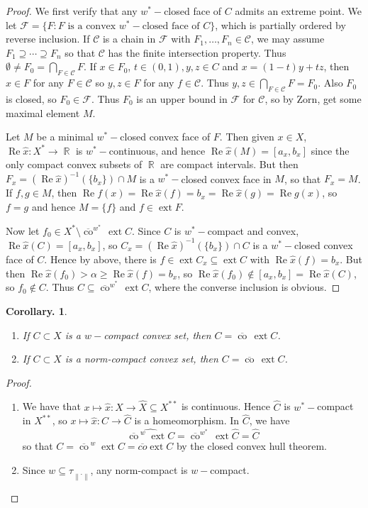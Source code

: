 \documentclass[11pt, a4paper]{memoir}
\DeclareMathOperator{\R}{{\mathbb{R}}}
\newcommand{\norm}[1]{\ensuremath{\left\lVert#1\right\rVert}}
\theoremstyle{change}
\newtheorem{corollary}[theorem]{Corollary.}
\theoremstyle{plain}
\theoremstyle{nonumberplain}
\newtheorem{proof}{Proof}
\renewcommand{\Re}{\ensuremath{\operatorname{Re}}}
\DeclareMathOperator{\ext}{ext}
\newcommand{\cwx}{\ensuremath{\overline{\operatorname{co}}^{w^*}\,}}
\newcommand{\cw}{\ensuremath{\overline{\operatorname{co}}\,}}
\numberwithin{equation}{section}
\begin{document}
\begin{proof}
    We first verify that any $w^*-$closed face of $C$ admits an extreme point.
    We let $\mathcal{F}=\{F:F\text{ is a convex $w^*-$closed face of $C$}\}$, which is partially ordered by reverse inclusion.
    If $\mathcal{C}$ is a chain in $\mathcal{F}$ with $F_1,\ldots,F_n\in\mathcal{C}$, we may assume $F_1\supseteq\cdots\supseteq F_n$ so that $\mathcal{C}$ has the finite intersection property.
    Thus $\emptyset\neq F_0=\bigcap_{F\in\mathcal{C}}F$.
    If $x\in F_0$, $t\in(0,1),y,z\in C$ and $x=(1-t)y+tz$, then $x\in F$ for any $F\in\mathcal{C}$ so $y,z\in F$ for any $f\in\mathcal{C}$.
    Thus $y,z\in\bigcap_{F\in\mathcal{C}}F=F_0$.
    Also $F_0$ is closed, so $F_0\in\mathcal{F}$.
    Thus $F_0$ is an upper bound in $\mathcal{F}$ for $\mathcal{C}$, so by Zorn, get some maximal element $M$.

    Let $M$ be a minimal $w^*-$closed convex face of $F$.
    Then given $x\in X$, $\Re\hat x:X^*\to\R$ is $w^*-$continuous, and hence $\Re\hat x(M)=[a_x,b_x]$ since the only compact convex subsets of $\R$ are compact intervals.
    But then $F_x=(\Re \hat x)^{-1}(\{b_x\})\cap M$ is a $w^*-$closed convex face in $M$, so that $F_x=M$.
    If $f,g\in M$, then $\Re f(x)=\Re\hat x(f)=b_x=\Re\hat x(g)=\Re g(x)$, so $f=g$ and hence $M=\{f\}$ and $f\in\ext F$.

    Now let $f_0\in X^*\setminus\cwx\ext C$.
    Since $C$ is $w^*-$compact and convex, $\Re\hat x(C)=[a_x,b_x]$, so $C_x=(\Re\hat x)^{-1}(\{b_x\})\cap C$ is a $w^*-$closed convex face of $C$.
    Hence by above, there is $f\in\ext C_x\subseteq\ext C$ with $\Re\hat x(f)=b_x$.
    But then $\Re\hat x(f_0)>\alpha\geq\Re\hat x(f)=b_x$, so $\Re\hat x(f_0)\notin[a_x,b_x]=\Re\hat x(C)$, so $f_0\notin C$.
    Thus $C\subseteq\cwx\ext C$, where the converse inclusion is obvious.
\end{proof}
\begin{corollary}
    \begin{enumerate}[nl,r]
        \item If $C\subset X$ is a $w-$compact convex set, then $C=\cw\ext C$.
        \item If $C\subset X$ is a norm-compact convex set, then $C=\cw\ext C$.
    \end{enumerate}
\end{corollary}
\begin{proof}
    \begin{enumerate}[nl,r]
        \item We have that $x\mapsto\hat x:X\to\hat X\subseteq X^{**}$ is continuous.
            Hence $\hat C$ is $w^*-$compact in $X^{**}$, so $x\mapsto\hat x:C\to\hat C$ is a homeomorphism.
            In $\hat C$, we have
            \begin{equation*}
                \widehat{\cw^w\ext C}=\cwx\ext\hat C=\hat C
            \end{equation*}
            so that $C=\cw^w\ext C=\overline{co}\ext C$ by the closed convex hull theorem.
        \item Since $w\subseteq\tau_{\norm{\cdot}}$, any norm-compact is $w-$compact.
    \end{enumerate}
\end{proof}
\end{document}
